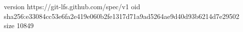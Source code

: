 version https://git-lfs.github.com/spec/v1
oid sha256:e33084cc53e6fa2e419e060b2fe1317d71a9ad5264ae9d40d93b6214d7e29502
size 10849
